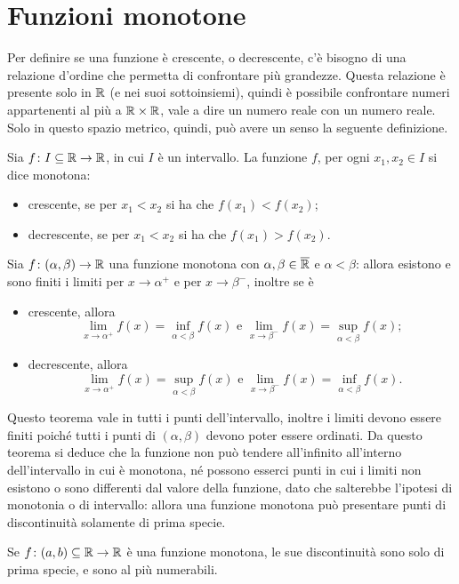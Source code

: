 \section{Funzioni monotone}
Per definire se una funzione è crescente, o decrescente, c'è bisogno di una relazione d'ordine che permetta di confrontare più grandezze. Questa relazione è presente solo in $\mathbb{R}$ (e nei suoi sottoinsiemi), quindi è possibile confrontare numeri appartenenti al più a $\mathbb{R}\times\mathbb{R}$, vale a dire un numero reale con un numero reale. Solo in questo spazio metrico, quindi, può avere un senso la seguente definizione.
\begin{definizione}
\label{d:monotonia}
Sia $f\colon I\subseteq\mathbb{R}\to\mathbb{R}$, in cui $I$ è un intervallo. La funzione $f$, per ogni $x_1,x_2\in I$ si dice monotona:
\begin{itemize}
\item crescente, se per $x_1<x_2$ si ha che $f(x_1)<f(x_2)$;
\item decrescente, se per $x_1<x_2$ si ha che $f(x_1)>f(x_2)$.
\end{itemize}
\end{definizione}
\begin{teorema}
Sia $f\colon(\alpha,\beta)\to\mathbb{R}$ una funzione monotona con $\alpha,\beta\in\overline{\mathbb{R}}$ e $\alpha<\beta$: allora esistono e sono finiti i limiti per $x\to\alpha^+$ e per $x\to\beta^-$, inoltre se è
\begin{itemize}
\item crescente, allora
\[
\lim_{x\to\alpha^+}f(x)=\inf_{\alpha<\beta}f(x)\text{ e }\lim_{x\to\beta^-}f(x)=\sup_{\alpha<\beta}f(x);
\]
\item decrescente, allora
\[
\lim_{x\to\alpha^+}f(x)=\sup_{\alpha<\beta}f(x)\text{ e }\lim_{x\to\beta^-}f(x)=\inf_{\alpha<\beta}f(x).
\]
\end{itemize}
\end{teorema}
Questo teorema vale in tutti i punti dell'intervallo, inoltre i limiti devono essere finiti poiché tutti i punti di $(\alpha,\beta)$ devono poter essere ordinati. Da questo teorema si deduce che la funzione non può tendere all'infinito all'interno dell'intervallo in cui è monotona, né possono esserci punti in cui i limiti non esistono o sono differenti dal valore della funzione, dato che salterebbe l'ipotesi di monotonia o di intervallo: allora una funzione monotona può presentare punti di discontinuità solamente di prima specie.
\begin{teorema}
Se $f\colon(a,b)\subseteq\mathbb{R}\to\mathbb{R}$ è una funzione monotona, le sue discontinuità sono solo di prima specie, e sono al più numerabili.
\end{teorema}
